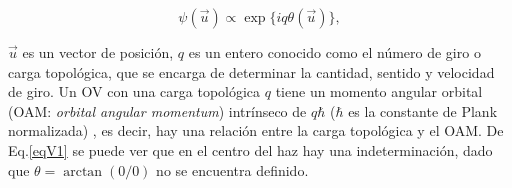 

\begin{equation}
\label{eqV1}
	\psi(\vec{u}) \propto \exp\{iq\theta(\vec{u}) \},
\end{equation}

$\vec{u}$ es un vector de posición, $q$ es un entero conocido como el número de giro o carga topológica, que se encarga de determinar la cantidad, sentido y velocidad de giro. Un OV con una carga topológica $q$ tiene un momento angular orbital (OAM: \textit{orbital angular momentum}) intrínseco de $q\hbar$ ($\hbar$ es la constante de Plank normalizada) \cite{Bazhenov1990, Uribe 2011}, es decir, hay una relación entre la carga topológica y el OAM. De Eq.\ref{eqV1} se puede ver que en el centro del haz hay una indeterminación, dado que $\theta=\arctan(0/0)$ no se encuentra definido.\\


